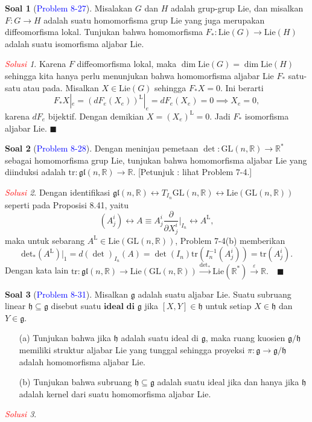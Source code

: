 \documentclass[11pt]{article}
\theoremstyle{definition}
\newtheorem*{problem}{Soal}
\theoremstyle{remark}
\newtheorem*{solution}{\textcolor{red}{Solusi}}
\newcommand{\er}{\mathbb{R}}            %
\newcommand{\GLnr}{\text{GL}(n,\mathbb{R})} %
\newcommand{\Lie}{\text{Lie}}               %
\newcommand{\LieG}{\text{Lie}(G)}           %
\newcommand{\LieH}{\text{Lie}(H)}               %
\begin{document}
\begin{problem}[\textcolor{blue}{Problem 8-27}]
Misalakan $G$ dan $H$ adalah grup-grup Lie, dan misalkan $F: G \to H$ adalah suatu homomorfisma grup Lie yang juga merupakan diffeomorfisma lokal. Tunjukan bahwa homomorfisma $F_* : \LieG \to \LieH$ adalah suatu isomorfisma aljabar Lie.
\end{problem}
\begin{solution}
Karena $F$ diffeomorfisma lokal, maka $\dim \LieG = \dim \LieH$ sehingga kita hanya perlu menunjukan bahwa homomorfisma aljabar Lie $F_*$ satu-satu atau pada. Misalkan $X \in \LieG$ sehingga $F_*X = 0$. Ini berarti 
$$
F_*X|_e = (dF_e(X_e))^{\text{L}}|_e = dF_e(X_e) = 0 \implies X_e = 0,
$$
karena $dF_e$ bijektif. Dengan demikian $X =  (X_e)^{\text{L}} = 0$. Jadi $F_*$ isomorfisma aljabar Lie. $\blacksquare$ 
\end{solution}

\begin{problem}[\textcolor{blue}{Problem 8-28}]
Dengan meninjau pemetaan $\det : \GLnr \to \er^*$ sebagai homomorfisma grup Lie, tunjukan bahwa homomorfisma aljabar Lie yang diinduksi adalah $\text{tr} : \mathfrak{gl}(n,\er) \to \er$. [Petunjuk : lihat Problem 7-4.] 
\end{problem}
\begin{solution}
Dengan identifikasi $\mathfrak{gl}(n,\er)\leftrightarrow T_{I_n}\GLnr \leftrightarrow \Lie(\GLnr)$ seperti pada Proposisi 8.41, yaitu
$$
(A^i_j) \leftrightarrow A\equiv A^i_j \frac{\partial}{\partial X^i_j}\Big|_{I_n} \leftrightarrow A^{\text{L}},
$$
maka untuk sebarang $A^{\text{L}} \in \Lie(\GLnr)$, Problem 7-4(b) memberikan
$$
\text{det}_*(A^{\text{L}})|_1 = d(\det)_{I_n}(A) = \det(I_n) \text{tr}(I_n^{-1} (A^i_j)) = \text{tr}(A^i_j).
$$
Dengan kata lain
$
\text{tr} : \mathfrak{gl}(n,\er) \longrightarrow \Lie(\GLnr) \xrightarrow{\text{det}_*} \Lie(\er^*) \xrightarrow{\varepsilon} \er. \quad \blacksquare
$
\end{solution}

\begin{problem}[\textcolor{blue}{Problem 8-31}]
Misalkan $\mathfrak{g}$ adalah suatu aljabar Lie. Suatu subruang linear $\mathfrak{h}\subseteq \mathfrak{g}$ disebut suatu $\textbf{ideal di } \mathfrak{g}$ jika $[X,Y] \in \mathfrak{h}$ untuk setiap $X \in \mathfrak{h}$ dan $Y \in \mathfrak{g}$.
\begin{itemize}
    \item [(a)] Tunjukan bahwa jika $\mathfrak{h}$ adalah suatu ideal di $\mathfrak{g}$, maka ruang kuosien $\mathfrak{g}/\mathfrak{h}$ memiliki struktur aljabar Lie yang tunggal sehingga proyeksi $\pi : \mathfrak{g} \to \mathfrak{g}/\mathfrak{h}$ adalah homomorfisma aljabar Lie.
    
    \item [(b)] Tunjukan bahwa subruang $\mathfrak{h} \subseteq \mathfrak{g}$ adalah suatu ideal jika dan hanya jika $\mathfrak{h}$ adalah kernel dari suatu homomorfisma aljabar Lie.
\end{itemize}
\end{problem}
\begin{solution}
\end{solution}
\end{document}

